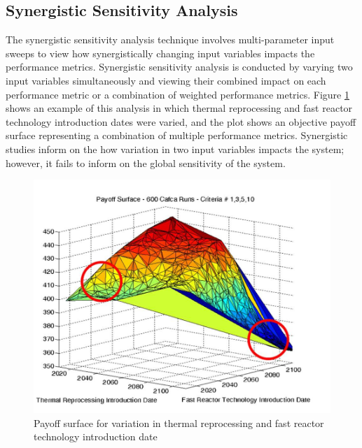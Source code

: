 \subsection{Synergistic Sensitivity Analysis}
The synergistic sensitivity analysis technique involves multi-parameter 
input sweeps to view how synergistically changing input variables 
impacts the performance metrics.  
Synergistic sensitivity analysis is conducted by varying 
two input variables simultaneously and viewing their 
combined impact on each performance metric or a combination 
of weighted performance metrics. 
Figure \ref{fig:passerini_payoff} shows an example of this analysis 
in which thermal reprocessing and fast reactor technology 
introduction dates were varied, and the plot shows an objective 
payoff surface representing a combination of multiple performance 
metrics. 
Synergistic studies inform on the how variation in 
two input variables impacts the system; however, it fails to inform 
on the global sensitivity of the system. 

\begin{figure}[]
	\begin{center}
		\includegraphics[scale=0.45]{./figures/passerini_payoff.jpg}
	\end{center}	
		\caption{Payoff surface for variation in thermal 
		reprocessing and fast reactor technology introduction date
		\cite{passerini_systematic_2014}}
	\label{fig:passerini_payoff}
\end{figure} 

